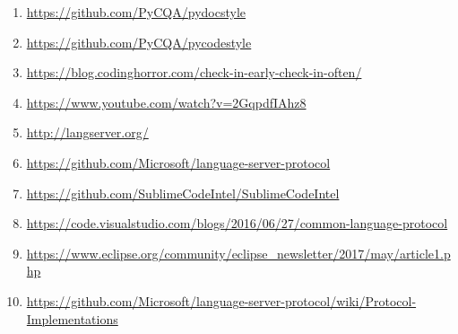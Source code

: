 {\begin{enumerate}
    \item \url{https://github.com/PyCQA/pydocstyle}
    \item \url{https://github.com/PyCQA/pycodestyle}
    \item \url{https://blog.codinghorror.com/check-in-early-check-in-often/}
    \item \url{https://www.youtube.com/watch?v=2GqpdfIAhz8}
    \item \url{http://langserver.org/}
    \item \url{https://github.com/Microsoft/language-server-protocol}
    \item \url{https://github.com/SublimeCodeIntel/SublimeCodeIntel}
    \item \url{https://code.visualstudio.com/blogs/2016/06/27/common-language-protocol}
    \item \url{https://www.eclipse.org/community/eclipse_newsletter/2017/may/article1.php}
    \item \url{https://github.com/Microsoft/language-server-protocol/wiki/Protocol-Implementations}
\end{enumerate}
}
